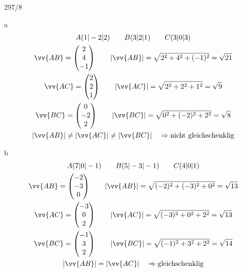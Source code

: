 \begin{exercise}{297/8}
  \item [a]
  \begin{gather*}
    A(1|-2|2) \qquad B(3|2|1) \qquad C(3|0|3) \\
    \vv{AB} = \begin{pmatrix}2 \\ 4 \\ -1\end{pmatrix} \qquad |\vv{AB}| = \sqrt{2^2 + 4^2 + (-1)^2} = \sqrt{21} \\
    \vv{AC} = \begin{pmatrix}2 \\ 2 \\ 1\end{pmatrix} \qquad |\vv{AC}| = \sqrt{2^2 + 2^2 + 1^2} = \sqrt{9} \\
    \vv{BC} = \begin{pmatrix}0 \\ -2 \\ 2\end{pmatrix} \qquad |\vv{BC}| = \sqrt{0^2 + (-2)^2 + 2^2} = \sqrt{8} \\
    |\vv{AB}| \neq |\vv{AC}| \neq |\vv{BC}| \quad\Rightarrow\text{nicht gleichschenklig}
  \end{gather*}
  \item [b]
  \begin{gather*}
    A(7|0|-1) \qquad B(5|-3|-1) \qquad C(4|0|1) \\
    \vv{AB} = \begin{pmatrix}-2 \\ -3 \\ 0\end{pmatrix} \qquad |\vv{AB}| = \sqrt{(-2)^2 + (-3)^2 + 0^2} = \sqrt{13} \\
    \vv{AC} = \begin{pmatrix}-3 \\ 0 \\ 2\end{pmatrix} \qquad |\vv{AC}| = \sqrt{(-3)^2 + 0^2 + 2^2} = \sqrt{13} \\
    \vv{BC} = \begin{pmatrix}-1 \\ 3 \\ 2\end{pmatrix} \qquad |\vv{BC}| = \sqrt{(-1)^2 + 3^2 + 2^2} = \sqrt{14} \\
    |\vv{AB}| = |\vv{AC}| \quad\Rightarrow\text{gleichschenklig}
  \end{gather*}
\end{exercise}

